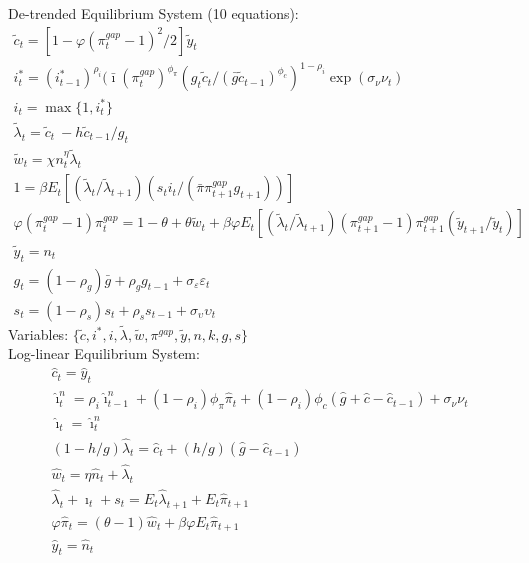 \documentclass[12pt, final]{article}
\begin{document}
\setcounter{equation}{0}
\noindent De-trended Equilibrium System (10 equations):
\small\begin{gather}
\tilde{c}_t = [1-\varphi(\pi_t^{gap} - 1)^2/2]\tilde{y}_t\\
i_t^*=(i^*_{t-1})^{\rho_i}(\bar{\imath}(\pi_t^{gap})^{\phi_\pi}(g_t\tilde{c}_t/(\bar{g}\tilde{c}_{t-1})^{\phi_c})^{1-\rho_i}\exp(\sigma_\nu\nu_t)\\
i_t=\max\{1,i_t^*\}\\
\tilde{\lambda}_t = \tilde{c}_t\ - h\tilde{c}_{t-1}/g_t\\
\tilde{w}_t = \chi n_t^\eta \tilde{\lambda}_t  \\
  1 = \beta E_t[(\tilde{\lambda}_t/\tilde{\lambda}_{t+1})(s_ti_t/(\bar{\pi}\pi_{t+1}^{gap}g_{t+1}))]\\
  \varphi(\pi_t^{gap}-1){\pi}_t^{gap} = 1-\theta + \theta\tilde{w}_t + \beta\varphi E_t[(\tilde{\lambda}_t/\tilde{\lambda}_{t+1}) (\pi_{t+1}^{gap}-1)\pi_{t+1}^{gap}(\tilde{y}_{t+1}/\tilde{y}_t)]\\
  \tilde{y}_t= n_t\\  
  g_t= (1-\rho_g)\bar{g}+\rho_gg_{t-1} + \sigma_\varepsilon\varepsilon_t \\
  s_t=(1-\rho_s)s_t+\rho_ss_{t-1} + \sigma_\upsilon\upsilon_t
\end{gather}
Variables: $\{\tilde{c},i^*,i,\tilde{\lambda},\tilde{w},\pi^{gap},\tilde{y},n,k,g,s\}$\\ 

\setcounter{equation}{0}
\noindent Log-linear Equilibrium System:
\begin{gather}
  \hat{c}_t = \hat{y}_t\\
  \hat{\imath}_t^n = \rho_i\hat{\imath}^n_{t-1} + (1-\rho_i)\phi_\pi\hat{\pi}_t+ (1-\rho_i)\phi_c(\hat{g}+\hat{c}-\hat{c}_{t-1})+\sigma_\nu\nu_t \\
  \hat{\imath}_t = \hat{\imath}_t^n\\
  (1-h/g)\hat{\lambda}_t = \hat{c}_t + (h/g)(\hat{g} - \hat{c}_{t-1})\\
  \hat{w}_t =  \eta\hat{n}_t + \hat{\lambda}_t\\
  \hat{\lambda}_t + \hat{\imath}_t + s_t  = E_t\hat{\lambda}_{t+1}+E_t\hat{\pi}_{t+1} \\
  \varphi\hat{\pi}_t = (\theta-1)\hat{w}_t+\beta\varphi E_t\hat{\pi}_{t+1}\\
  \hat{y}_t = \hat{n}_t 
\end{gather}
\pagebreak
\setcounter{equation}{0}
\end{document}
